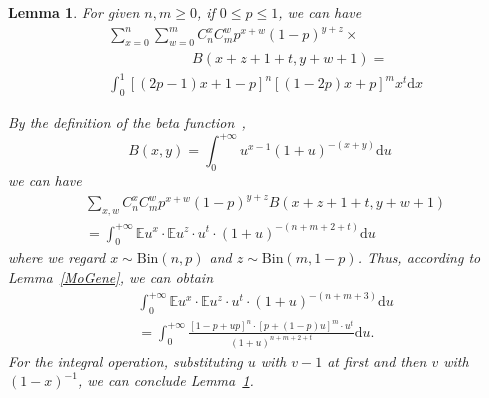 \documentclass{article}
\makeatletter
\newcounter{lemmas}
\newtheorem{lemma}[lemmas]{Lemma}
\renewenvironment{proof}[1][\proofname]{\par
  \vspace{-\topsep}%
  \pushQED{\qed}%
  \normalfont
  \topsep0pt \partopsep0pt %
  \trivlist
  \item[\hskip\labelsep
        \itshape
    #1\@addpunct{.}]\ignorespaces
}{%
  \popQED\endtrivlist\@endpefalse
  \addvspace{0pt plus 0pt} %
}
\makeatother
\begin{document}
\begin{lemma}
\label{SolveF}
For given $n,m\geq 0$, if $0\leq p\leq 1$, we can have
\begin{equation*}
\begin{split}
&{\sum}_{x=0}^{n}{\sum}_{w=0}^{m} C_{n}^{x}C_{m}^{w}p^{x+w}(1-p)^{y+z}\times\\
&\qquad\qquad\qquad B(x+z+1+t,y+w+1)=\\
&\int_{0}^{1}[(2p-1)x+1-p]^{n}[(1-2p)x+p]^{m}x^{t}\mathrm{d}x
\end{split}
\end{equation*}
\begin{proof}
By the definition of the beta function~\cite{olver2010nist},
\begin{equation}
B(x, y) = \int_{0}^{+\infty} u^{x-1}(1+u)^{-(x+y)}\mathrm{d}u
\end{equation}
we can have
\begin{align}
&\sum_{x,w} C_{n}^{x}C_{m}^{w}p^{x+w}(1-p)^{y+z}B(x+z+1+t,y+w+1)\nonumber\\
&= \int_{0}^{+\infty} \mathbb{E}u^{x}\cdot\mathbb{E}u^z \cdot u^t\cdot (1+u)^{-(n+m+2+t)}\mathrm{d}u
\end{align}
where we regard $x\sim \mathrm{Bin}(n,p)$ and $z\sim \mathrm{Bin}(m,1-p)$.
Thus, according to Lemma~\ref{MoGene}, we can obtain
\begin{equation}
\begin{split}
&\int_{0}^{+\infty} \mathbb{E}u^{x}\cdot\mathbb{E}u^z \cdot u^t\cdot (1+u)^{-(n+m+3)}\mathrm{d}u\\
&=\int_{0}^{+\infty} \frac{[1-p+up]^n\cdot [p+(1-p)u]^m\cdot u^t}{(1+u)^{n+m+2+t}}\mathrm{d}u.
\end{split}
\end{equation}
For the integral operation, substituting $u$ with $v-1$ at first and then $v$ with $(1-x)^{-1}$, we can conclude Lemma~\ref{SolveF}.
\end{proof}
\end{lemma}
\end{document}
